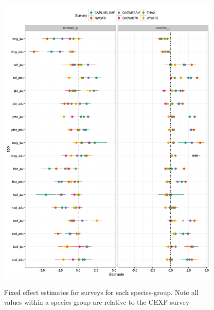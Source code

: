 \documentclass{article}
\begin{document}
\begin{figure}[!ht]
\begin{center}
	\includegraphics[width = 0.9\linewidth]{"figures/Suppl - QEstimatesALL"}
	\label{fig:S11}
	\caption{Fixed effect estimates for surveys for each species-group. Note
	all values within a species-group are relative to the CEXP survey}
	\end{center}
\end{figure}
\end{document}
